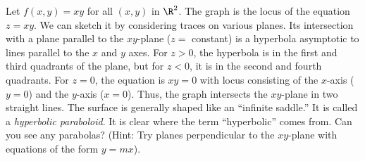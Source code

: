 \begin{example}
	Let $f(x,y) = xy$ for all $(x,y)$ in $\R^2$.    The graph is the
	locus of the equation $z = xy$.  We can sketch it by considering
	traces on various planes.  Its intersection with a plane parallel
	to the $xy$-plane ($z =$ constant) is a hyperbola asymptotic to
	lines parallel to the $x$ and $y$ axes.   For $z > 0$, the hyperbola
	is in the first and third quadrants of the plane, but for
	$z < 0$, it is in the second and fourth quadrants.  For $z = 0$,
	the equation is $xy = 0$ with locus consisting of the $x$-axis
	($y = 0$) and the $y$-axis ($x = 0$).   Thus, the graph intersects
	the $xy$-plane in two straight lines.  The surface is generally
	shaped like an ``infinite saddle.''  It is called a {\it hyperbolic
	paraboloid}.  It is clear where the term ``hyperbolic'' comes from.
	Can you see any parabolas?  (Hint: Try planes perpendicular to
	the $xy$-plane with equations of the form  $y = mx$).

	
	\begin{center}
	\end{center}
\end{example}

